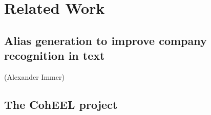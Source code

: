 \section{Related Work}
\subsection{Alias generation to improve company recognition in text}
(Alexander Immer)
\subsection{The CohEEL project}